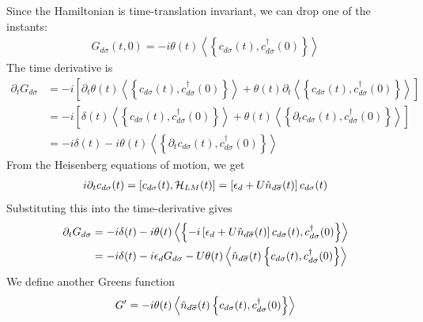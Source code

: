 \documentclass[12pt,twoside]{article}
\numberwithin{equation}{section}
\begin{document}
Since the Hamiltonian is time-translation invariant, we can drop one of the instants:
\begin{equation}\begin{aligned}
	G_{d\sigma}(t, 0) = -i\theta(t) \left<\left\{ c_{d\sigma}(t), c^\dagger_{d\sigma}(0) \right\} \right>
\end{aligned}\end{equation}
The time derivative is
\begin{equation}\begin{aligned}
	\partial_t G_{d\sigma} &= -i \left[\partial_t \theta(t) \left<\left\{ c_{d\sigma}(t), c^\dagger_{d\sigma}(0) \right\} \right> + \theta(t) \partial_t \left<\left\{ c_{d\sigma}(t), c^\dagger_{d\sigma}(0) \right\} \right>\right] \\
			       &= -i \left[\delta(t) \left<\left\{ c_{d\sigma}(t), c^\dagger_{d\sigma}(0) \right\} \right> + \theta(t) \left<\left\{ \partial_t c_{d\sigma}(t), c^\dagger_{d\sigma}(0) \right\} \right>\right]\\
			       &= -i \delta(t) -i\theta(t) \left<\left\{ \partial_t c_{d\sigma}(t), c^\dagger_{d\sigma}(0) \right\} \right>
\end{aligned}\end{equation}
From the Heisenberg equations of motion, we get
\begin{equation}\begin{aligned}
	i \partial_t c_{d\sigma}(t) = \left[c_{d\sigma}(t), \mathcal{H}_{LM}(t)\right] = \left[\epsilon_d + U \hat n_{d\overline\sigma}(t)\right]c_{d\sigma}(t)
\end{aligned}\end{equation}
Substituting this into the time-derivative gives
\begin{equation}\begin{aligned}
	\partial_t G_{d\sigma} &= -i \delta(t) -i \theta(t) \left<\left\{ -i\left[\epsilon_d + U \hat n_{d\overline\sigma}(t)\right]c_{d\sigma}(t), c^\dagger_{d\sigma}(0) \right\} \right>\\
			       &= -i \delta(t) - i\epsilon_d G_{d\sigma} - U \theta(t) \left<\hat n_{d\overline\sigma}(t)\left\{c_{d\sigma}(t), c^\dagger_{d\sigma}(0) \right\} \right>\\
\end{aligned}\end{equation}
We define another Greens function
\begin{equation}\begin{aligned}
	G^\prime = -i \theta(t) \left<\hat n_{d\overline\sigma}(t)\left\{c_{d\sigma}(t), c^\dagger_{d\sigma}(0) \right\} \right>
\end{aligned}\end{equation}
\end{document}
